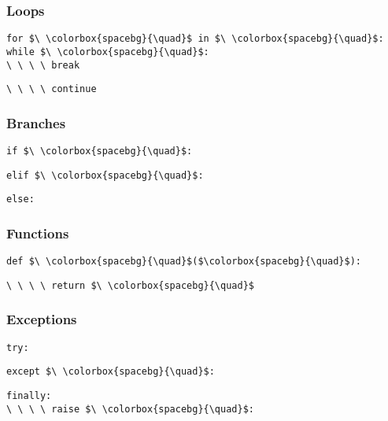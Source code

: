 \documentclass[12pt,twocolumn]{article}
\begin{document}
	\begin{minipage}[t]{0.23\textwidth}
		\subsubsection*{Loops}
		
		\colorbox{codebg}{\lstinline|for $\ \colorbox{spacebg}{\quad}$ in $\ \colorbox{spacebg}{\quad}$:|} \\
		
		\colorbox{codebg}{\lstinline|while $\ \colorbox{spacebg}{\quad}$:|} \\
		
		\colorbox{codebg}{\lstinline|\ \ \ \ break|}
		\vspace{1mm}
		
		\colorbox{codebg}{\lstinline|\ \ \ \ continue|} \\
		
		\subsubsection*{Branches}
		
		\colorbox{codebg}{\lstinline|if $\ \colorbox{spacebg}{\quad}$:|}
		\vspace{1mm}
		
		\colorbox{codebg}{\lstinline|elif $\ \colorbox{spacebg}{\quad}$:|}
		\vspace{1mm}
		
		\colorbox{codebg}{\lstinline|else:|}
	\end{minipage}
	\hfill
	\begin{minipage}[t]{0.23\textwidth}
		\subsubsection*{Functions}
		
		\colorbox{codebg}{\lstinline|def $\ \colorbox{spacebg}{\quad}$($\colorbox{spacebg}{\quad}$):|}
		
		\vspace{1mm}
		
		\colorbox{codebg}{\lstinline|\ \ \ \ return $\ \colorbox{spacebg}{\quad}$|} \\
		
		\subsubsection*{Exceptions}
		
		\colorbox{codebg}{\lstinline|try:|}
		\vspace{1mm}
		
		\colorbox{codebg}{\lstinline|except $\ \colorbox{spacebg}{\quad}$:|}
		\vspace{1mm}
		
		
		\colorbox{codebg}{\lstinline|finally:|} \\
		
		\colorbox{codebg}{\lstinline|\ \ \ \ raise $\ \colorbox{spacebg}{\quad}$:|}
	\end{minipage}
	
\end{document}

